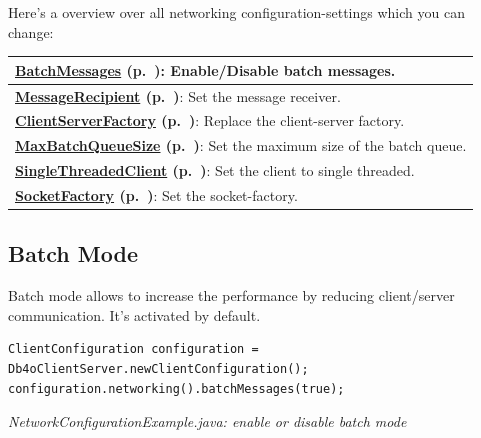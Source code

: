 Here's a overview over all networking configuration-settings which you can change:

{\small
\begin{longtable}{|p{}|}
\hline
\textbf{\hyperref[ref:configuration-networking-batch-mode]{BatchMessages} (p.~\pageref{ref:configuration-networking-batch-mode})}: Enable/Disable batch messages. \\ \hline
\textbf{\hyperref[ref:client-server-messaging]{MessageRecipient} (p.~\pageref{ref:client-server-messaging})}: Set the message receiver. \\ \hline
\textbf{\hyperref[ref:configuration-networking-client-server-factory]{ClientServerFactory} (p.~\pageref{ref:configuration-networking-client-server-factory})}: Replace the client-server factory. \\ \hline
\textbf{\hyperref[ref:configuration-networking-max-batch-queue-size]{MaxBatchQueueSize} (p.~\pageref{ref:configuration-networking-max-batch-queue-size})}: Set the maximum size of the batch queue. \\ \hline
\textbf{\hyperref[ref:configuration-networking-single-threaded-client]{SingleThreadedClient} (p.~\pageref{ref:configuration-networking-single-threaded-client})}: Set the client to single threaded. \\ \hline
\textbf{\hyperref[ref:configuration-networking-pluggable-sockets]{SocketFactory} (p.~\pageref{ref:configuration-networking-pluggable-sockets})}: Set the socket-factory. \\ \hline
\end{longtable}}

\subsection{Batch Mode}
\label{ref:configuration-networking-batch-mode}

Batch mode allows to increase the performance by reducing client/server communication. It's activated by default.

\begin{lstlisting}
ClientConfiguration configuration = Db4oClientServer.newClientConfiguration();
configuration.networking().batchMessages(true);
\end{lstlisting}

{\small\itshape NetworkConfigurationExample.java: enable or disable batch mode\par}
\medskip


